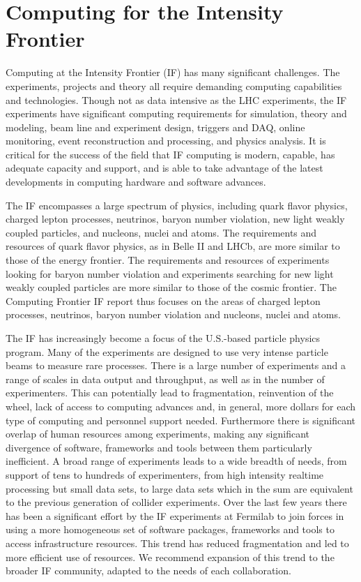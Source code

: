 \section{Computing for the Intensity Frontier}

Computing at the Intensity Frontier (IF) has many significant challenges. The
experiments, projects and theory all require demanding computing capabilities
and technologies.  Though not as data intensive as the LHC experiments, the IF
experiments have significant computing requirements for simulation,  theory
and modeling, beam line and experiment design, triggers and DAQ, online
monitoring, event reconstruction and processing, and physics analysis.  It is
critical for the success of the field that IF computing is modern, capable,
has adequate capacity and support, and is able to take advantage of the latest
developments in computing hardware and software advances.

The IF encompasses a large spectrum of physics, including quark flavor
physics,  charged lepton processes, neutrinos, baryon number violation,  new
light weakly coupled particles, and nucleons, nuclei and atoms.  The
requirements and resources of quark flavor physics, as in Belle II and LHCb,
are more similar to those of the energy frontier. The requirements and
resources of  experiments looking for baryon number violation and  experiments
searching for new light weakly coupled particles are more similar to  those of the
cosmic frontier.  The Computing Frontier IF report thus focuses on the areas
of charged lepton processes,  neutrinos, baryon number violation and nucleons,
nuclei and atoms.

The IF has increasingly become a focus of the U.S.-based particle physics program. Many  of
the experiments are designed to use very intense particle beams to measure
rare processes. There is a large number of experiments and a range of scales
in data output and throughput, as well as in the number of experimenters.
This can potentially lead to fragmentation, reinvention of the wheel, lack of
access to computing advances and, in general, more dollars for each type of
computing and personnel support needed. Furthermore there is significant
overlap of human resources among experiments, making any significant
divergence of  software, frameworks and tools between them particularly
inefficient.  A broad range of experiments leads to a wide breadth of needs,
from support of tens to hundreds of experimenters, from high intensity
realtime processing but small data sets, to large data sets which in the sum
are equivalent to the previous generation of collider experiments. Over the
last few years there has been a significant effort by the IF experiments at
Fermilab to join forces in using a more homogeneous set of software packages,
frameworks and tools to access infrastructure resources. This trend has
reduced fragmentation and led to more efficient use of resources. We recommend
expansion of this trend to the broader IF community, adapted to the needs of each
collaboration.

